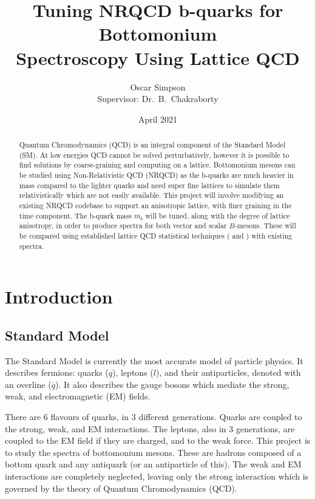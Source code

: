 \documentclass[a4paper,12pt]{article}
\title{Tuning NRQCD b-quarks for Bottomonium \\ Spectroscopy Using Lattice QCD}
\author{Oscar Simpson \\ Supervisor: Dr.\ B.\ Chakraborty}
\date{April 2021}
\begin{document}
\maketitle
\begin{abstract}
    Quantum Chromodynamics (QCD) is an integral component of the Standard Model (SM). At low energies QCD cannot be solved perturbatively, however it is possible to find solutions by coarse-graining and computing on a lattice. Bottomonium mesons can be studied using Non-Relativistic QCD (NRQCD) as the b-quarks are much heavier in mass compared to the lighter quarks and need super fine lattices to simulate them relativistically which are not easily available. This project will involve modifying an existing NRQCD codebase to support an anisotropic lattice, with finer graining in the time component. The b-quark mass $m_b$ will be tuned, along with the degree of lattice anisotropy, in order to produce spectra for both vector and scalar $B$-mesons. These will be compared using established lattice QCD statistical techniques ( and ) with existing spectra.
\end{abstract}

\tableofcontents
\pagebreak

\section{Introduction}
\subsection{Standard Model}
The Standard Model is currently the most accurate model of particle physics. It describes fermions: quarks ($q$), leptons ($l$), and their antiparticles, denoted with an overline ($\overline{q}$). It also describes the gauge bosons which mediate the strong, weak, and electromagnetic (EM) fields. 

There are 6 flavours of quarks, in 3 different generations. Quarks are coupled to the strong, weak, and EM interactions. The leptons, also in 3 generations, are coupled to the EM field if they are charged, and to the weak force. This project is to study the spectra of bottomonium mesons. These are hadrons composed of a bottom quark and any antiquark (or an antiparticle of this). The weak and EM interactions are completely neglected, leaving only the strong interaction which is governed by the theory of Quantum Chromodynamics (QCD).
\end{document}

